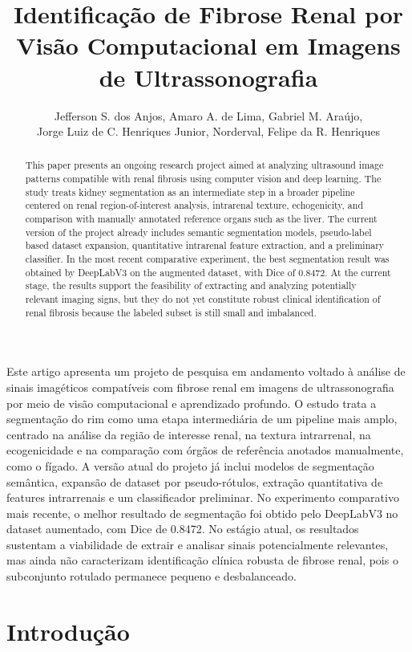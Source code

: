 \documentclass[12pt]{article}
\title{Identificação de Fibrose Renal por Visão Computacional em Imagens de Ultrassonografia}
\author{
  Jefferson S. dos Anjos\inst{1}, Amaro A. de Lima\inst{1},
  Gabriel M. Araújo\inst{1},\\ Jorge Luiz de C. Henriques Junior\inst{2},
  Norderval\inst{2}, Felipe da R. Henriques\inst{1}
}
\begin{document}
\maketitle

\begin{abstract}
This paper presents an ongoing research project aimed at analyzing ultrasound image patterns compatible with renal fibrosis using computer vision and deep learning. The study treats kidney segmentation as an intermediate step in a broader pipeline centered on renal region-of-interest analysis, intrarenal texture, echogenicity, and comparison with manually annotated reference organs such as the liver. The current version of the project already includes semantic segmentation models, pseudo-label based dataset expansion, quantitative intrarenal feature extraction, and a preliminary classifier. In the most recent comparative experiment, the best segmentation result was obtained by DeepLabV3 on the augmented dataset, with Dice of 0.8472. At the current stage, the results support the feasibility of extracting and analyzing potentially relevant imaging signs, but they do not yet constitute robust clinical identification of renal fibrosis because the labeled subset is still small and imbalanced.
\end{abstract}

\begin{resumo}
Este artigo apresenta um projeto de pesquisa em andamento voltado à análise de sinais imagéticos compatíveis com fibrose renal em imagens de ultrassonografia por meio de visão computacional e aprendizado profundo. O estudo trata a segmentação do rim como uma etapa intermediária de um pipeline mais amplo, centrado na análise da região de interesse renal, na textura intrarrenal, na ecogenicidade e na comparação com órgãos de referência anotados manualmente, como o fígado. A versão atual do projeto já inclui modelos de segmentação semântica, expansão de dataset por pseudo-rótulos, extração quantitativa de features intrarrenais e um classificador preliminar. No experimento comparativo mais recente, o melhor resultado de segmentação foi obtido pelo DeepLabV3 no dataset aumentado, com Dice de 0.8472. No estágio atual, os resultados sustentam a viabilidade de extrair e analisar sinais potencialmente relevantes, mas ainda não caracterizam identificação clínica robusta de fibrose renal, pois o subconjunto rotulado permanece pequeno e desbalanceado.
\end{resumo}

\section{Introdução}
\end{document}
